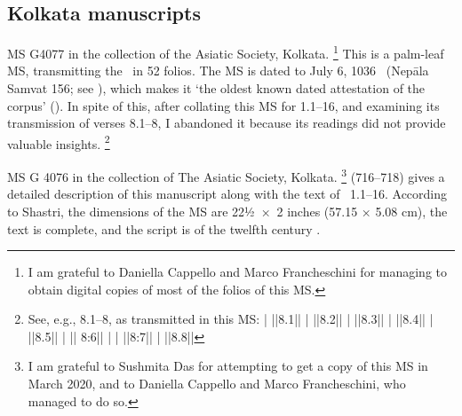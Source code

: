 \medskip
\subsection{Kolkata manuscripts}






MS G4077 in the collection of the Asiatic Society, Kolkata.%
	\footnote{I am grateful to Daniella Cappello and Marco Francheschini
                  for managing to obtain digital copies of most of the folios of this MS.}
This is a palm-leaf MS, transmitting the \VSS\ in 52 folios.
The MS is dated to July 6, 1036 \CE\ (Nepāla Samvat 156; 
see ), which makes
it `the oldest known dated attestation of the corpus'
().
In spite of this, after collating this MS for 1.1--16, and examining
its transmission of verses 8.1--8,
I abandoned it because its readings did not provide valuable insights.%
        \footnote{See, e.g., 8.1--8, as transmitted in this MS:
         |
         ||8.1||
         |
         ||8.2||
         |
         ||8.3||
         |
         ||8.4||
         |
         ||8.5||
         |
         || 8:6||
         |
         |
         ||8:7||
         |
         ||8.8||}

MS G 4076 in the collection of The Asiatic Society, Kolkata.%
	\footnote{I am grateful to Sushmita Das for attempting to 
			get a copy of this MS in March 2020,
                        and to Daniella Cappello and Marco Francheschini, who
                        managed to do so.}
 (716--718) gives a 
detailed description of this manuscript along with the text
of \VSS\ 1.1--16. According to Shastri, the dimensions of the MS are
22½~×~2 inches (57.15 × 5.08 cm), the text is complete, and
the script is of the twelfth century \CE. 

